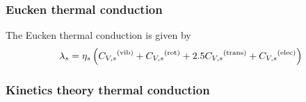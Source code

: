 \subsubsection{Eucken thermal conduction}

The Eucken thermal conduction is given by
\begin{equation}
\thermcond[s] = \vis[s]\left(\foreach \pre/\mod in {/vib,+/rot,+2.5/trans,+/elec} 
                {
                    \pre\specificHeat[\Vol,s]^{(\text{\mod})}
                }
                \right)
\label{thermal_cond:eucken:eq}
\end{equation}

\subsubsection{Kinetics theory thermal conduction}

